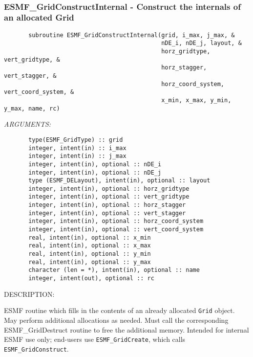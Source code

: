  
\mbox{}\hrulefill\ 
 
\subsubsection{ESMF\_GridConstructInternal - Construct the internals of an allocated Grid}


 
\begin{verbatim}       subroutine ESMF_GridConstructInternal(grid, i_max, j_max, &
                                             nDE_i, nDE_j, layout, &
                                             horz_gridtype, vert_gridtype, &
                                             horz_stagger, vert_stagger, &
                                             horz_coord_system, vert_coord_system, &
                                             x_min, x_max, y_min, y_max, name, rc)\end{verbatim}{\em ARGUMENTS:}
\begin{verbatim}       type(ESMF_GridType) :: grid
       integer, intent(in) :: i_max
       integer, intent(in) :: j_max
       integer, intent(in), optional :: nDE_i
       integer, intent(in), optional :: nDE_j
       type (ESMF_DELayout), intent(in), optional :: layout
       integer, intent(in), optional :: horz_gridtype
       integer, intent(in), optional :: vert_gridtype
       integer, intent(in), optional :: horz_stagger
       integer, intent(in), optional :: vert_stagger
       integer, intent(in), optional :: horz_coord_system
       integer, intent(in), optional :: vert_coord_system
       real, intent(in), optional :: x_min
       real, intent(in), optional :: x_max
       real, intent(in), optional :: y_min
       real, intent(in), optional :: y_max
       character (len = *), intent(in), optional :: name
       integer, intent(out), optional :: rc\end{verbatim}
{\sf DESCRIPTION:\\ }


       ESMF routine which fills in the contents of an already
       allocated {\tt Grid} object.  May perform additional allocations
       as needed.  Must call the corresponding ESMF\_GridDestruct
       routine to free the additional memory.  Intended for internal
       ESMF use only; end-users use {\tt ESMF\_GridCreate}, which calls
       {\tt ESMF\_GridConstruct}.
  
